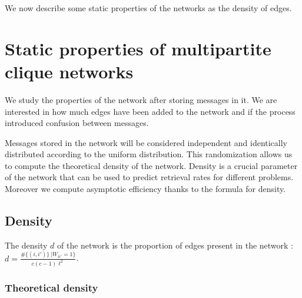\documentclass[english,10pt,twocolumn]{IEEEtran}
\renewcommand{\ge}{\geqslant}
\newcommand*\Let[2]{\State #1 $\gets$ #2}
\theoremstyle{definition}
\begin{document}
		
		
	
	We now describe some static properties of the networks as the density of edges.
	
	\section{Static properties of multipartite clique networks}	
	
	We study the properties of the network after storing messages in it. We are interested in how much edges have been added to the network and if the process introduced confusion between messages.	
	
	Messages stored in the network will be considered independent and identically distributed according to the uniform distribution. This randomization allows us to compute the theoretical density of the network. %
	Density is a crucial parameter of the network that can be used to predict retrieval rates for different problems. Moreover we compute asymptotic efficiency thanks to the formula for density.
	
	\subsection{Density}
		
	The density $d$ of the network is the proportion of edges present in the network : $d = \frac{\# \{(i, i') \} \, | W_{ii'} = 1 \}}{c(c-1)\ell^2}$.
	
	\subsubsection{Theoretical density}
	
\end{document}

